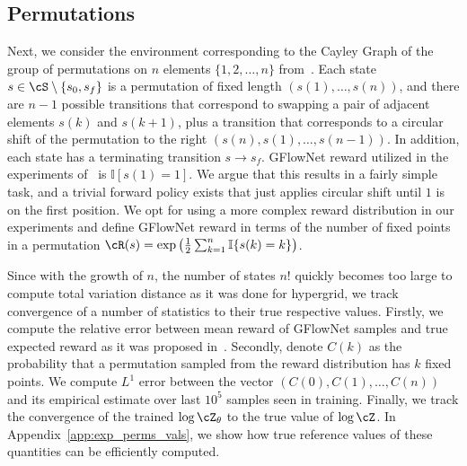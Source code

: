 \subsection{Permutations}
\label{sec:perms}


Next, we consider the environment corresponding to the Cayley Graph of the group of permutations on $n$ elements $\{1, 2, \dots, n\}$ from~\cite{brunswic2024theory}. Each state $s \in \cS \setminus \{s_0, s_f\}$ is a permutation of fixed length $(s(1), \dots, s(n))$, and there are $n - 1$ possible transitions that correspond to swapping a pair of adjacent elements $s(k)$ and $s(k+1)$, plus a transition that corresponds to a circular shift of the permutation to the right $(s(n), s(1), \dots, s(n-1))$. In addition, each state has a terminating transition $s \to s_f$. GFlowNet reward utilized in the experiments of~\cite{brunswic2024theory} is $\mathbb{I}[s(1) = 1]$. We argue that this results in a fairly simple task, and a trivial forward policy exists that just applies circular shift until $1$ is on the first position. We opt for using a more complex reward distribution in our experiments and define GFlowNet reward in terms of the number of fixed points in a permutation $\cR(s) = \exp\left(\frac{1}{2}\sum_{k=1}^n\mathbb{I}\{s(k) = k\}\right)$. 

Since with the growth of $n$, the number of states $n!$ quickly becomes too large to compute total variation distance as it was done for hypergrid, we track convergence of a number of statistics to their true respective values. Firstly, we compute the relative error between mean reward of GFlowNet samples and true expected reward as it was proposed in~\cite{shen2023towards}. Secondly, denote $C(k)$ as the probability that a permutation sampled from the reward distribution has $k$ fixed points. We compute $L^1$ error between the vector $(C(0), C(1), \dots, C(n))$ and its empirical estimate over last $10^5$ samples seen in training. Finally, we track the convergence of the trained $\log \cZ_{\theta}$ to the true value of $\log \cZ$. In Appendix~\ref{app:exp_perms_vals}, we show how true reference values of these quantities can be efficiently computed.

